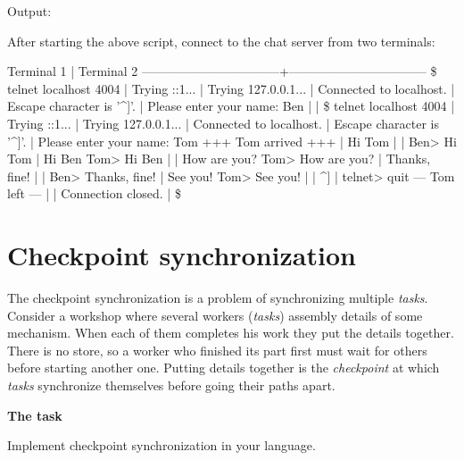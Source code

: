 \begin{wideverbatim}

Output:

After starting the above script, connect to the chat server from two terminals:

           Terminal 1            |           Terminal 2
---------------------------------+---------------------------------
\$ telnet localhost 4004         |
Trying ::1...                    |
Trying 127.0.0.1...              |
Connected to localhost.          |
Escape character is '^]'.        |
Please enter your name: Ben      |
                                 | \$ telnet localhost 4004
                                 | Trying ::1...
                                 | Trying 127.0.0.1...
                                 | Connected to localhost.
                                 | Escape character is '^]'.
                                 | Please enter your name: Tom
+++ Tom arrived +++              |
Hi Tom                           |
                                 | Ben> Hi Tom
                                 | Hi Ben
Tom> Hi Ben                      |
                                 | How are you?
Tom> How are you?                |
Thanks, fine!                    |
                                 | Ben> Thanks, fine!
                                 | See you!
Tom> See you!                    |
                                 | ^]
                                 | telnet> quit
--- Tom left ---                 |
                                 | Connection closed.
                                 | \$

\end{wideverbatim}

\pagebreak{}
\section*{Checkpoint synchronization}

The checkpoint synchronization is a problem of synchronizing multiple
\emph{tasks}. Consider a workshop where several workers (\emph{tasks})
assembly details of some mechanism. When each of them completes his
work they put the details together. There is no store, so a worker who
finished its part first must wait for others before starting another
one. Putting details together is the \emph{checkpoint} at which
\emph{tasks} synchronize themselves before going their paths apart.

\textbf{The task}

Implement checkpoint synchronization in your language.

